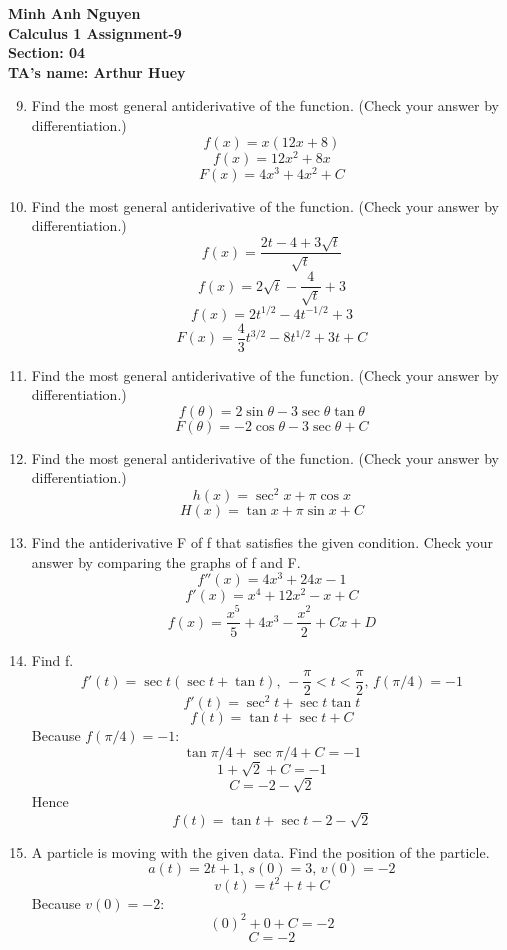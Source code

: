 \documentclass[12pt]{article}
\begin{document}
\textbf{Minh Anh Nguyen }\\
\textbf{Calculus 1 Assignment-9}\\
\textbf{Section: 04}\\
\textbf{TA's name: Arthur Huey}

\hrulefill

\begin{enumerate}
    \setcounter{enumi}{8}
    \item Find the most general antiderivative of the function. (Check your answer by differentiation.)
    \[f(x) = x(12x + 8)\]
    \[f(x) = 12x^2 + 8x\]
    \[F(x) = 4x^3 + 4x^2 + C\]
    \setcounter{enumi}{14}
    \item Find the most general antiderivative of the function. (Check your answer by differentiation.)
    \[f(x) = \frac{2t - 4 + 3\sqrt{t}}{\sqrt{t}}\]
    \[f(x) = 2\sqrt{t} - \frac{4}{\sqrt{t}} + 3\]
    \[f(x) = 2t^{1/2} - 4t^{-1/2} + 3\]
    \[F(x) = \frac{4}{3}t^{3/2} - 8t^{1/2} + 3t + C\]
    \setcounter{enumi}{18}
    \item Find the most general antiderivative of the function. (Check your answer by differentiation.)
    \[f(\theta) = 2\sin\theta - 3\sec\theta\tan\theta\]
    \[F(\theta) = -2\cos\theta - 3\sec\theta + C\]
    \setcounter{enumi}{21}
    \item Find the most general antiderivative of the function. (Check your answer by differentiation.)
    \[h(x) = \sec^2 x + \pi\cos x\]
    \[H(x) = \tan x + \pi\sin x + C\]
    \setcounter{enumi}{28}
    \item Find the antiderivative F of f that satisfies the given condition. Check your answer by comparing the graphs of f and F.
    \[f''(x) = 4x^3 + 24x - 1\]
    \[f'(x) = x^4 + 12x^2 - x + C\]
    \[f(x) = \frac{x^5}{5} + 4x^3 - \frac{x^2}{2} + Cx + D\]
    \setcounter{enumi}{38}
    \item Find f.
    \[f'(t) = \sec t(\sec t + \tan t)\text{, } -\frac{\pi}{2} < t < \frac{\pi}{2} \text{, } f(\pi/4) = -1\]
    \[f'(t) = \sec^2 t + \sec t \tan t\]
    \[f(t) = \tan t + \sec t + C\]
    Because $f(\pi/4) = -1$:
    \[\tan \pi/4 + \sec \pi/4 + C = -1\]
    \[1 + \sqrt{2} + C = -1\]
    \[C = -2 - \sqrt{2}\]
    Hence
    \[f(t) = \tan t + \sec t -2 -\sqrt{2}\]
    \setcounter{enumi}{60}
    \item A particle is moving with the given data. Find the position of the particle.
    \[a(t) = 2t + 1\text{, }s(0) = 3\text{, }v(0) = -2\]
    \[v(t) = t^2 + t + C\]
    Because $v(0) = -2$:
    \[(0)^2 + 0 + C = -2\]
    \[C = -2\]

\end{enumerate}
\end{document}
